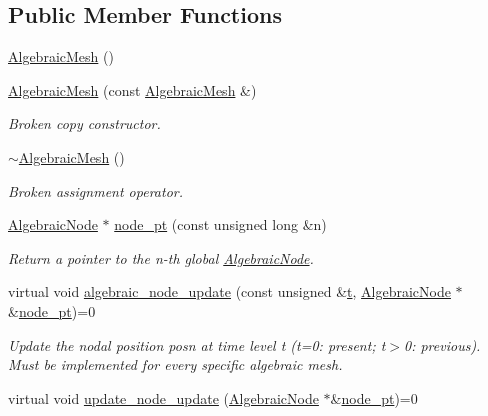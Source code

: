\subsection*{Public Member Functions}
\begin{DoxyCompactItemize}
\item 
\hyperlink{classoomph_1_1AlgebraicMesh_a27bab6278bc48a4bf5d22874fc1a0e16}{Algebraic\+Mesh} ()
\item 
\hyperlink{classoomph_1_1AlgebraicMesh_a83aeb848d30991ccb959c553769e00e3}{Algebraic\+Mesh} (const \hyperlink{classoomph_1_1AlgebraicMesh}{Algebraic\+Mesh} \&)
\begin{DoxyCompactList}\small\item\em Broken copy constructor. \end{DoxyCompactList}\item 
\hyperlink{classoomph_1_1AlgebraicMesh_a148dc4078a5fa2cc9ae651003e3a14ca}{$\sim$\+Algebraic\+Mesh} ()
\begin{DoxyCompactList}\small\item\em Broken assignment operator. \end{DoxyCompactList}\item 
\hyperlink{classoomph_1_1AlgebraicNode}{Algebraic\+Node} $\ast$ \hyperlink{classoomph_1_1AlgebraicMesh_aedeebbe95d2f8e67e9939cecd1be3933}{node\+\_\+pt} (const unsigned long \&n)
\begin{DoxyCompactList}\small\item\em Return a pointer to the n-\/th global \hyperlink{classoomph_1_1AlgebraicNode}{Algebraic\+Node}. \end{DoxyCompactList}\item 
virtual void \hyperlink{classoomph_1_1AlgebraicMesh_ab01d6f93354f3c4e5c9d1f0a5885a65b}{algebraic\+\_\+node\+\_\+update} (const unsigned \&\hyperlink{cfortran_8h_af6f0bd3dc13317f895c91323c25c2b8f}{t}, \hyperlink{classoomph_1_1AlgebraicNode}{Algebraic\+Node} $\ast$\&\hyperlink{classoomph_1_1AlgebraicMesh_aedeebbe95d2f8e67e9939cecd1be3933}{node\+\_\+pt})=0
\begin{DoxyCompactList}\small\item\em Update the nodal position posn at time level t (t=0\+: present; t$>$0\+: previous). Must be implemented for every specific algebraic mesh. \end{DoxyCompactList}\item 
virtual void \hyperlink{classoomph_1_1AlgebraicMesh_a6c6a35ae2be6e2766f5b80d85693c1ce}{update\+\_\+node\+\_\+update} (\hyperlink{classoomph_1_1AlgebraicNode}{Algebraic\+Node} $\ast$\&\hyperlink{classoomph_1_1AlgebraicMesh_aedeebbe95d2f8e67e9939cecd1be3933}{node\+\_\+pt})=0

\end{DoxyCompactItemize}
